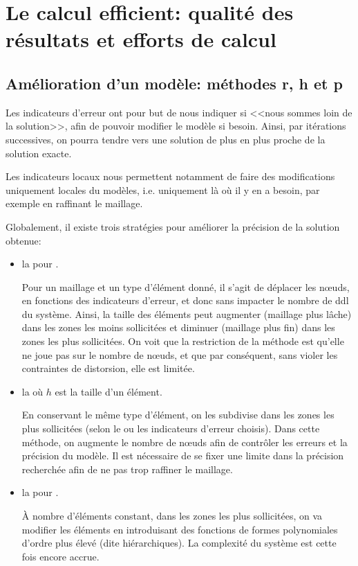 \chapter{Le calcul efficient: qualité des résultats et efforts de calcul}\label{Ch-Amelio}


\medskip
\section{Amélioration d'un modèle: méthodes r, h et p}\label{Sec-rhp}

Les indicateurs d'erreur ont pour but de nous indiquer si <<nous sommes loin de 
la solution>>, afin de pouvoir modifier le modèle si besoin.
Ainsi, par itérations successives, on pourra tendre vers une solution
de plus en plus proche de la solution exacte.

Les indicateurs locaux nous permettent notamment de faire des modifications uniquement
locales du modèles, i.e. uniquement là où il y en a besoin, par exemple en
raffinant le maillage.

\medskip
Globalement, il existe trois stratégies pour améliorer la précision de la
solution obtenue:
\begin{itemize}
   \item la  pour .

	Pour un maillage et un type d'élément donné, il s'agit de déplacer les nœuds,
	en fonctions des indicateurs d'erreur, et donc sans impacter le nombre de ddl du système.
	Ainsi, la taille des éléments peut augmenter (maillage plus lâche) dans les
	zones les moins sollicitées et diminuer (maillage plus fin) dans les zones les plus
	sollicitées.
	On voit que la restriction de la méthode est qu'elle ne joue pas sur le nombre
	de nœuds, et que par conséquent, sans violer les contraintes de distorsion,
	elle est limitée.
   \item la  où $h$ est la taille d'un élément.

	En conservant le même type d'élément, on les subdivise dans les zones 
	les plus sollicitées (selon le ou les indicateurs d'erreur choisis).
	Dans cette méthode, on augmente le nombre de nœuds afin de contrôler
	les erreurs et la précision du modèle.
	Il est nécessaire de se fixer une limite dans la précision recherchée afin
	de ne pas trop raffiner le maillage.
   \item la  pour .

	À nombre d'éléments constant, dans les zones les plus 	sollicitées, 
	on va modifier les éléments en introduisant des fonctions de formes polynomiales
	d'ordre plus élevé (dite hiérarchiques).
	La complexité du système est cette fois encore accrue.
\end{itemize}

